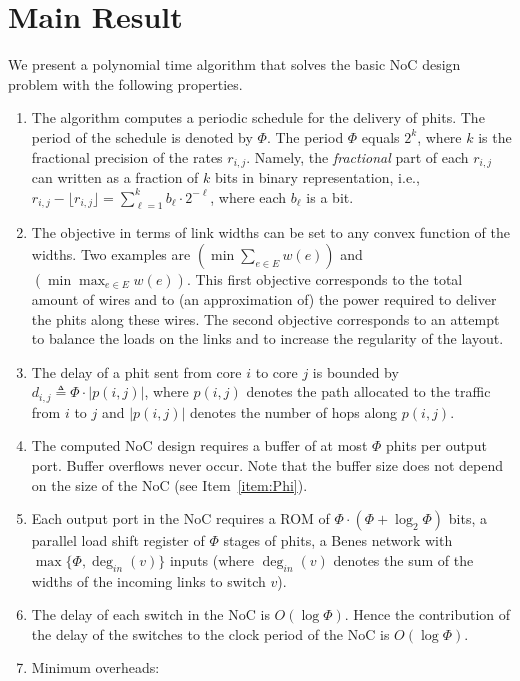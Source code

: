 \documentclass[a4paper,12pt]{article}
\newenvironment{proof sketch}[1]{\noindent {\emph{Proof sketch of #1:}}}{\hfill \qed}
\newcommand{\degin}{\deg_{\textit{in}}}
\begin{document}
\section{Main Result}
We present a polynomial time algorithm that solves the basic NoC design problem with
the following properties.

\begin{enumerate}
\item\label{item:Phi} The algorithm computes a periodic schedule for the delivery of phits. The
  period of the schedule is denoted by $\Phi$. The period $\Phi$ equals $2^k$, where
  $k$ is the fractional precision of the rates $r_{i,j}$. Namely, the
  \emph{fractional} part of each $r_{i,j}$ can written as a fraction of $k$ bits in
  binary representation, i.e., $r_{i,j} - \lfloor r_{i,j} \rfloor = \sum_{\ell=1}^{k}
  b_{\ell} \cdot 2^{-\ell}$, where each $b_\ell$ is a bit.
\item The objective in terms of link widths can be set to any convex function of the
  widths. Two examples are $(\min \sum_{e\in E} w(e))$ and $(\min \max_{e\in E}
  w(e))$.  This first objective corresponds to the total amount of wires and to (an
  approximation of) the power required to deliver the phits along these wires. The
  second objective corresponds to an attempt to balance the loads on the links and to
  increase the regularity of the layout.
\item The delay of a phit sent from core $i$ to core $j$ is bounded by
  $d_{i,j}\triangleq\Phi\cdot |p(i,j)|$, where $p(i,j)$ denotes the path allocated to
  the traffic from $i$ to $j$ and $|p(i,j)|$ denotes the number of hops along
  $p(i,j)$.
\item The computed NoC design requires a buffer of at most $\Phi$ phits per output
  port. Buffer overflows never occur. Note that the buffer size does not depend on
  the size of the NoC (see Item~\ref{item:Phi}).
\item Each output port in the NoC requires a ROM of $\Phi \cdot (\Phi + \log_2 \Phi)$
  bits, a parallel load shift register of $\Phi$ stages of phits, a Benes network
  with $\max\{\Phi,\degin (v)\}$ inputs (where $\degin (v)$ denotes the sum of the
  widths of the incoming links to switch $v$).
\item The delay of each switch in the NoC is $O(\log \Phi)$. Hence the contribution
  of the delay of the switches to the clock period of the NoC is $O(\log \Phi)$.
\item Minimum overheads: 
  \begin{itemize}

\end{itemize}
\end{enumerate}
\end{document}
